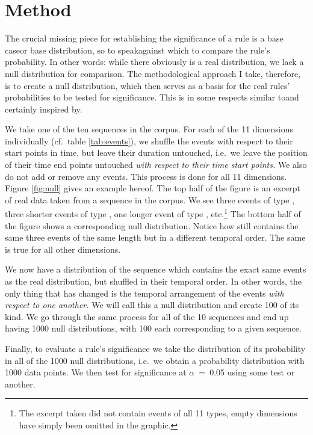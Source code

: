 \section{Method}
\label{sec:significancemethod}
The crucial missing piece for establishing the significance of a rule is a base case\dash or base distribution, so to speak\dash against which to compare the rule's probability. In other words: while there obviously is a real distribution, we lack a null distribution for comparison. The methodological approach I take, therefore, is to create a null distribution, which then serves as a basis for the real rules' probabilities to be tested for significance. This is in some respects similar to\dash and certainly inspired by\dash \citet[]{abuzhaya17}.

We take one of the ten sequences in the corpus. For each of the 11 dimensions individually (cf.~table \ref{tab:events}), we shuffle the events with respect to their start points in time, but leave their duration untouched, i.e.~we leave the position of their time end points untouched \emph{with respect to their time start points.} We also do not add or remove any events. This process is done for all 11 dimensions. Figure \ref{fig:null} gives an example hereof. The top half of the figure is an excerpt of real data taken from a sequence in the corpus. We see three events of type , three shorter events of type , one longer event of type , etc.\footnote{The excerpt taken did not contain events of all 11 types, empty dimensions have simply been omitted in the graphic.} The bottom half of the figure shows a corresponding null distribution. Notice how  still contains the same three events of the same length but in a different temporal order. The same is true for all other dimensions.

We now have a distribution of the sequence which contains the exact same events as the real distribution, but shuffled in their temporal order. In other words, the only thing that has changed is the temporal arrangement of the events \emph{with respect to one another.} We will call this a null distribution and create 100 of its kind. %
We go through the same process for all of the 10 sequences and end up having 1000 null distributions, with 100 each corresponding to a given sequence.

Finally, to evaluate a rule's significance we take the distribution of its probability in all of the 1000 null distributions, i.e.~we obtain a probability distribution with 1000 data points. We then test for significance at \(\alpha\)~=~0.05 using some test or another. %

